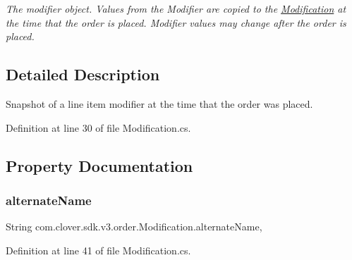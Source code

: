 \begin{DoxyCompactItemize}
\begin{DoxyCompactList}\small\item\em The modifier object. Values from the Modifier are copied to the \hyperlink{classcom_1_1clover_1_1sdk_1_1v3_1_1order_1_1_modification}{Modification} at the time that the order is placed. Modifier values may change after the order is placed. \end{DoxyCompactList}\end{DoxyCompactItemize}


\subsection{Detailed Description}
Snapshot of a line item modifier at the time that the order was placed. 



Definition at line 30 of file Modification.\+cs.



\subsection{Property Documentation}
\mbox{\label{classcom_1_1clover_1_1sdk_1_1v3_1_1order_1_1_modification_abbb9955f6f35a2a051afdd5a124553dc}} 
\subsubsection{\texorpdfstring{alternate\+Name}{alternateName}}
{\footnotesize\ttfamily String com.\+clover.\+sdk.\+v3.\+order.\+Modification.\+alternate\+Name\hspace{0.3cm}{\ttfamily [get]}, {\ttfamily [set]}}



Definition at line 41 of file Modification.\+cs.

\mbox{\label{classcom_1_1clover_1_1sdk_1_1v3_1_1order_1_1_modification_ac845d0ac88478caf23e4c19bcdec2a43}} 
